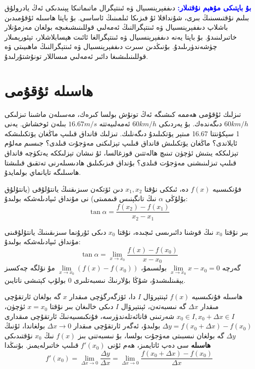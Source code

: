 \par\bigskip
\begin{tcolorbox}
	\textcolor{blue}{\textbf{بۇ باپتىكى مۇھېم نۇقتىلار:}}
دىففېرېنسىيال ۋە ئىنتېگرال ماتىماتىكا پېنىدىكى ئەڭ يادرولۇق بىلىم نۇقتىسىنىڭ بىرى، شۇنداقلا ئۇ فىزىكا ئىلمىنىڭ ئاساسى. بۇ باپتا ھاسىلە ئۇقۇمىدىن باشلاپ دىففېرېنسىيال ۋە ئىنتېگرالنىڭ ئەمەلىي قوللىنىشىغىچە بولغان مەزمۇنلار خاتىرلىنىدۇ. بۇ باپتا يەنە دىففېرېنسىيال ۋە ئىنتېگرالغا ئائىت ھېسابلاشلار، تېئورېمىلار چۈشەندۈرىلىدۇ. بۇنىڭدىن سىرت دىففېرېنسىيال ۋە ئىنتېگرالنىڭ ماھىيىتى ۋە قوللىنىلىشىغا دائىر ئەمەلىي مىساللار تونۇشتۇرلىدۇ.
\end{tcolorbox}

\section{ھاسىلە ئۇقۇمى}
تىزلىك ئۇقۇمى ھەممە كىشىگە ئەڭ تونۇش بولسا كىرەك، مەسىلەن ماشىنا تىزلىكى $60 km/h$ دىگەندەك. بۇ يەردىكى  $60 km/h$ ئەمەلىيەتتە  $16.67 m/s$ بىلەن ئوخشاش. يەنى 1 سېكۇنتتا 16.67 مىتېر يۆتكىلىدۇ دىگەنلىك. تىزلىك قانداق قىلىپ ماڭغان يۆتكىلىشكە ئايلاندى؟ ماڭغان يۆتكىلىش قانداق قىلىپ تېزلىكنى مەۋجۇت قىلدى؟ جىسىم مەلۇم تېزلىككە يىتىش ئۈچۈن تىنىچ ھالەتتىن قوزغالسا، ئۇ نىشان تېزلىككە يەتكۈچە قانداق قىلىپ تىزلىنىشنى مەۋجۇت قىلدى؟ بۇنداق فىزىكىلىق ھادىسىلەرنى تەتقىق قىلىشتا ھاسىلىگە تايانماي بولمايدۇ.

فۇنكىسىيە 
$f(x)$
دە، ئىككى نۇقتا
$x_1,x_2$
دىن ئۆتكەن سىزىقنىڭ يانتۇلۇقى (يانتۇلۇق بۇلۇڭى $\alpha$ نىڭ تانگېنىس قىممىتى)
نى مۇنداق ئىپادىلەشكە بولىدۇ:
$$\tan\alpha = \frac{f(x_2)-f(x_1)}{x_2-x_1}$$

 بىر نۇقتا
$x_0$
 نىڭ قوشنا دائىرىسى  ئىچىدە، نۇقتا
$x_0$
دىكى ئۇرۇنما سىزىقىنىڭ يانتۇلۇقىنى مۇنداق ئىپادىلەشكە بولىدۇ:
$$\tan\alpha = \lim\limits_{x\to x_0}\frac{f(x)-f(x_0)}{x-x_0}$$
گەرچە 
$\lim\limits_{x\to x_0}{x-x_0} =0$
بولسىمۇ،
$\lim\limits_{x\to x_0}{(f(x)-f(x_0))}$
مۇ نۆلگە چەكسىز يېقىنلىشىدۇ، شۇڭا بۇلارنىڭ نىسبەتلىرى 0 بولۇپ كېتىشى ناتايىن.

\begin{MyDefinition}{ھاسىلە}{}
فۇنكىسىيە 
$f(x)$
ئېنتېرۋال
$I$
دا، ئۆزگەرگۈچى مىقدار 
$x$
گە بولغان ئارتقۇچى مىقدار
$\Delta x$
گە نىسبەتەن، ئېنتېرۋال $I$ دىكى خالىغان بىر نۇقتا 
$x=x_0$ 
ئۈچۈن،
$x_0 \in I, x_0+\Delta x \in I$
شەرتىنى قانائەتلەندۈرسە،
فۇنكىسىيەنىڭ ئارتقۇچى مىقدارى 
$\Delta y = f(x_0+\Delta x)-f(x_0)$
بولىدۇ،
ئەگەر ئارتقۇچى مىقدار 
$\Delta x \to 0$
بولغاندا، ئۇنىڭ
$\Delta y$
گە بولغان نىسبىتى مەۋجۇت بولسا، بۇ نىسبەتنى بىز 
$f(x)$
نىڭ 
$x_0$
نۇقتىدىكى
\textbf{ھاسىلە}
سى دەپ ئاتايمىز، ھەم ئۇنى
$f'(x_0)$
قىلىپ خاتىرلەيمىز. بۇنىڭدا
$$
f'(x_0) = \lim\limits_{\Delta x \to 0}\frac{\Delta y}{\Delta x}
= \lim\limits_{\Delta x \to 0}\frac{f(x_0+\Delta x)-f(x_0)}{\Delta x}
$$

\end{MyDefinition}

